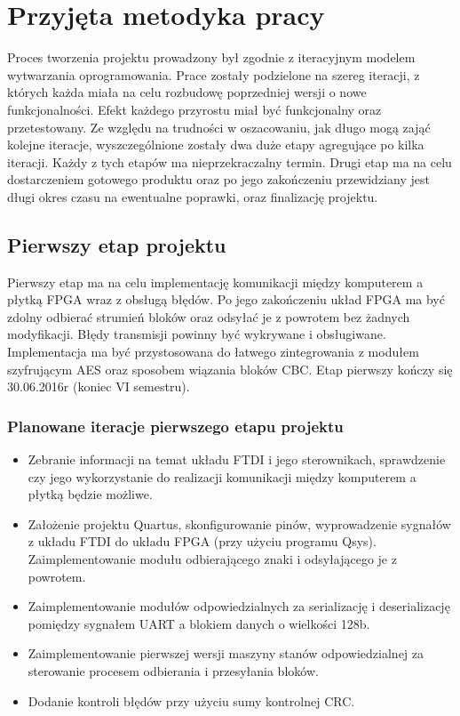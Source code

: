 \section{Przyjęta metodyka pracy}
\label{sec:przyjeta-metodyka-pracy}
Proces tworzenia projektu prowadzony był zgodnie z iteracyjnym modelem wytwarzania oprogramowania. Prace zostały podzielone na szereg iteracji, z których każda miała na celu rozbudowę poprzedniej wersji o nowe funkcjonalności. Efekt każdego przyrostu miał być funkcjonalny oraz przetestowany.
\newline
Ze względu na trudności w oszacowaniu, jak długo mogą zająć kolejne iteracje, wyszczególnione zostały dwa duże etapy agregujące po kilka iteracji. Każdy z tych etapów ma nieprzekraczalny termin. Drugi etap ma na celu dostarczeniem gotowego produktu oraz po jego zakończeniu przewidziany jest długi okres czasu na ewentualne poprawki, oraz finalizację projektu.

\subsection{Pierwszy etap projektu}
Pierwszy etap ma na celu implementację komunikacji między komputerem a płytką FPGA wraz z obsługą błędów. Po jego zakończeniu układ FPGA ma być zdolny odbierać strumień bloków oraz odsyłać je z powrotem bez żadnych modyfikacji. Błędy transmisji powinny być wykrywane i obsługiwane. Implementacja ma być przystosowana do łatwego zintegrowania z modułem szyfrującym AES oraz sposobem wiązania bloków CBC. Etap pierwszy kończy się 30.06.2016r (koniec VI semestru).

\subsubsection{Planowane iteracje pierwszego etapu projektu}
\begin{itemize}
\item Zebranie informacji na temat układu FTDI i jego sterownikach, sprawdzenie czy jego wykorzystanie do realizacji komunikacji między komputerem a płytką będzie możliwe.
\item Założenie projektu Quartus, skonfigurowanie pinów, wyprowadzenie sygnałów z układu FTDI do układu FPGA (przy użyciu programu Qsys). Zaimplementowanie modułu odbierającego znaki i odsyłającego je z powrotem.
\item Zaimplementowanie modułów odpowiedzialnych za serializację i deserializację pomiędzy sygnałem UART a blokiem danych o wielkości 128b.
\item Zaimplementowanie pierwszej wersji maszyny stanów odpowiedzialnej za sterowanie procesem odbierania i przesyłania bloków.
\item Dodanie kontroli błędów przy użyciu sumy kontrolnej CRC.
\end{itemize}

